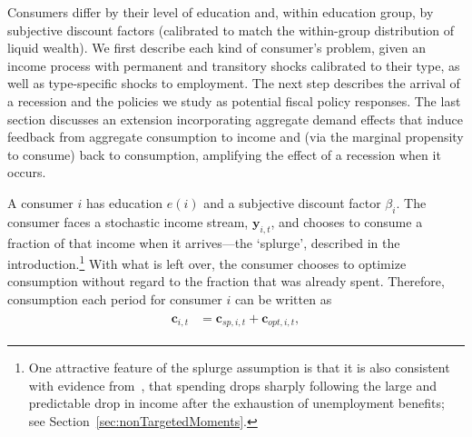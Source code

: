 \documentclass[qe]{econsocart}
\begin{document}
Consumers differ by their level of education and, within education group, by subjective discount factors (calibrated to match the within-group distribution of liquid wealth). We first describe each kind of consumer's problem, given an income process with permanent and transitory shocks calibrated to their type, as well as type-specific shocks to employment. The next step describes the arrival of a recession and the policies we study as potential fiscal policy responses. The last section discusses an extension incorporating aggregate demand effects that induce feedback from aggregate consumption to income and (via the marginal propensity to consume) back to consumption, amplifying the effect of a recession when it occurs.

A consumer $i$ has education $e(i)$ and a subjective discount factor $\beta_i$. The consumer faces a stochastic income stream, $\mathbf{y}_{i,t}$, and chooses to consume a fraction of that income when it arrives---the `splurge', described in the introduction.\footnote{One attractive feature of the splurge assumption is that it is also consistent with evidence from~\cite{ganongConsumer2019}, that spending drops sharply following the large and predictable drop in income after the exhaustion of unemployment benefits; see Section~\ref{sec:nonTargetedMoments}.} With what is left over, the consumer chooses to optimize consumption without regard to the fraction that was already spent. Therefore, consumption each period for consumer $i$ can be written as
\begin{equation}
    \begin{gathered}
      \begin{aligned}
        \mathbf{c}_{i,t} & = \mathbf{c}_{sp,i,t} + \mathbf{c}_{opt,i,t}, \label{eq:model} 
      \end{aligned}
    \end{gathered}
  \end{equation}
\end{document}
